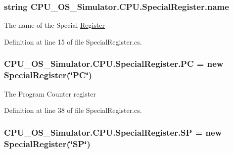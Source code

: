 \subsubsection[{name}]{\setlength{\rightskip}{0pt plus 5cm}string C\+P\+U\+\_\+\+O\+S\+\_\+\+Simulator.\+C\+P\+U.\+Special\+Register.\+name\hspace{0.3cm}{\ttfamily [private]}}\label{class_c_p_u___o_s___simulator_1_1_c_p_u_1_1_special_register_ac521aef66f5fe6a88486e70f5ade8326}


The name of the Special \hyperlink{class_c_p_u___o_s___simulator_1_1_c_p_u_1_1_register}{Register} 



Definition at line 15 of file Special\+Register.\+cs.

\hypertarget{class_c_p_u___o_s___simulator_1_1_c_p_u_1_1_special_register_afc3205003157a5f135752e6a4f8ffb8a}{}
\subsubsection[{P\+C}]{ C\+P\+U\+\_\+\+O\+S\+\_\+\+Simulator.\+C\+P\+U.\+Special\+Register.\+P\+C = new {\bf Special\+Register}(\char`\"{}P\+C\char`\"{})\hspace{0.3cm}{\ttfamily [static]}}\label{class_c_p_u___o_s___simulator_1_1_c_p_u_1_1_special_register_afc3205003157a5f135752e6a4f8ffb8a}


The Program Counter register 



Definition at line 38 of file Special\+Register.\+cs.

\hypertarget{class_c_p_u___o_s___simulator_1_1_c_p_u_1_1_special_register_ae1699c7972763e73e3f1cfe467cc82e9}{}
\subsubsection[{S\+P}]{ C\+P\+U\+\_\+\+O\+S\+\_\+\+Simulator.\+C\+P\+U.\+Special\+Register.\+S\+P = new {\bf Special\+Register}(\char`\"{}S\+P\char`\"{})\hspace{0.3cm}{\ttfamily [static]}}\label{class_c_p_u___o_s___simulator_1_1_c_p_u_1_1_special_register_ae1699c7972763e73e3f1cfe467cc82e9}


